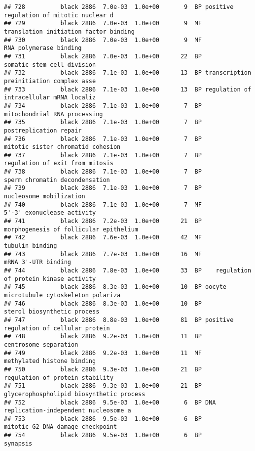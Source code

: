 \documentclass[]{article}
\begin{document}
\begin{verbatim}
## 728          black 2886  7.0e-03  1.0e+00       9  BP positive regulation of mitotic nuclear d
## 729          black 2886  7.0e-03  1.0e+00       9  MF    translation initiation factor binding
## 730          black 2886  7.0e-03  1.0e+00       9  MF                   RNA polymerase binding
## 731          black 2886  7.0e-03  1.0e+00      22  BP               somatic stem cell division
## 732          black 2886  7.1e-03  1.0e+00      13  BP transcription preinitiation complex asse
## 733          black 2886  7.1e-03  1.0e+00      13  BP regulation of intracellular mRNA localiz
## 734          black 2886  7.1e-03  1.0e+00       7  BP             mitochondrial RNA processing
## 735          black 2886  7.1e-03  1.0e+00       7  BP                   postreplication repair
## 736          black 2886  7.1e-03  1.0e+00       7  BP        mitotic sister chromatid cohesion
## 737          black 2886  7.1e-03  1.0e+00       7  BP          regulation of exit from mitosis
## 738          black 2886  7.1e-03  1.0e+00       7  BP           sperm chromatin decondensation
## 739          black 2886  7.1e-03  1.0e+00       7  BP                  nucleosome mobilization
## 740          black 2886  7.1e-03  1.0e+00       7  MF               5'-3' exonuclease activity
## 741          black 2886  7.2e-03  1.0e+00      21  BP   morphogenesis of follicular epithelium
## 742          black 2886  7.6e-03  1.0e+00      42  MF                          tubulin binding
## 743          black 2886  7.7e-03  1.0e+00      16  MF                      mRNA 3'-UTR binding
## 744          black 2886  7.8e-03  1.0e+00      33  BP    regulation of protein kinase activity
## 745          black 2886  8.3e-03  1.0e+00      10  BP oocyte microtubule cytoskeleton polariza
## 746          black 2886  8.3e-03  1.0e+00      10  BP              sterol biosynthetic process
## 747          black 2886  8.8e-03  1.0e+00      81  BP positive regulation of cellular protein 
## 748          black 2886  9.2e-03  1.0e+00      11  BP                    centrosome separation
## 749          black 2886  9.2e-03  1.0e+00      11  MF               methylated histone binding
## 750          black 2886  9.3e-03  1.0e+00      21  BP          regulation of protein stability
## 751          black 2886  9.3e-03  1.0e+00      21  BP glycerophospholipid biosynthetic process
## 752          black 2886  9.5e-03  1.0e+00       6  BP DNA replication-independent nucleosome a
## 753          black 2886  9.5e-03  1.0e+00       6  BP         mitotic G2 DNA damage checkpoint
## 754          black 2886  9.5e-03  1.0e+00       6  BP                                 synapsis

\end{verbatim}
\end{document}

